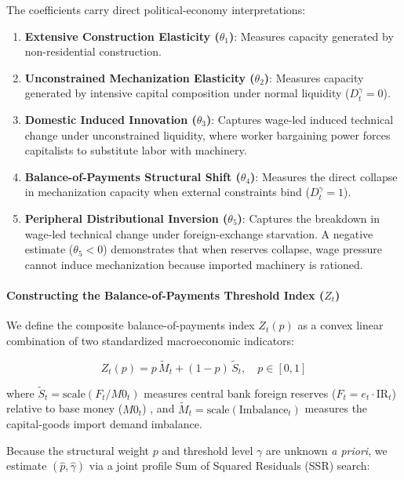The coefficients carry direct political-economy interpretations:
\begin{enumerate}
	\item \textbf{Extensive Construction Elasticity ($\theta_1$)}: Measures capacity generated by non-residential construction.
	\item \textbf{Unconstrained Mechanization Elasticity ($\theta_2$)}: Measures capacity generated by intensive capital composition under normal liquidity ($D_t^{\gamma} = 0$).
	\item \textbf{Domestic Induced Innovation ($\theta_3$)}: Captures wage-led induced technical change under unconstrained liquidity, where worker bargaining power forces capitalists to substitute labor with machinery.
	\item \textbf{Balance-of-Payments Structural Shift ($\theta_4$)}: Measures the direct collapse in mechanization capacity when external constraints bind ($D_t^{\gamma} = 1$).
	\item \textbf{Peripheral Distributional Inversion ($\theta_5$)}: Captures the breakdown in wage-led technical change under foreign-exchange starvation. A negative estimate ($\theta_5 < 0$) demonstrates that when reserves collapse, wage pressure cannot induce mechanization because imported machinery is rationed.
\end{enumerate}

\paragraph{Constructing the Balance-of-Payments Threshold Index ($Z_t$)}
We define the composite balance-of-payments index $Z_t(p)$ as a convex linear combination of two standardized macroeconomic indicators:

\begin{equation}
	Z_t(p) = p \, \tilde{M}_t + (1 - p) \, \tilde{S}_t, \quad p \in [0, 1]
\end{equation}

where $\tilde{S}_t = \text{scale}(F_t / M0_t)$ measures central bank foreign reserves ($F_t = e_t \cdot \text{IR}_t$) relative to base money ($M0_t$) \citep{NievasPiketty2025}, and $\tilde{M}_t = \text{scale}(\text{Imbalance}_t)$ measures the capital-goods import demand imbalance. 

Because the structural weight $p$ and threshold level $\gamma$ are unknown \textit{a priori}, we estimate $(\hat{p}, \hat{\gamma})$ via a joint profile Sum of Squared Residuals (SSR) search:

